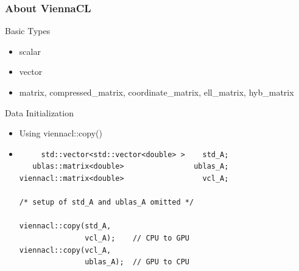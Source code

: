 \begin{frame}[fragile]
\frametitle{About ViennaCL}

 \begin{block}{Basic Types}
   \begin{itemize}
    \item scalar
    \item vector
    \item matrix, compressed\_matrix, coordinate\_matrix, ell\_matrix, hyb\_matrix
   \end{itemize}
 \end{block}

 \begin{block}{Data Initialization}
    \begin{itemize}
     \item Using viennacl::copy() 
    \item  { \black
  \begin{lstlisting}
     std::vector<std::vector<double> >    std_A;
   ublas::matrix<double>                ublas_A;
viennacl::matrix<double>                  vcl_A;

/* setup of std_A and ublas_A omitted */

viennacl::copy(std_A,
               vcl_A);    // CPU to GPU
viennacl::copy(vcl_A,
               ublas_A);  // GPU to CPU
  \end{lstlisting} }
 \end{itemize}

 \end{block}
\end{frame}


